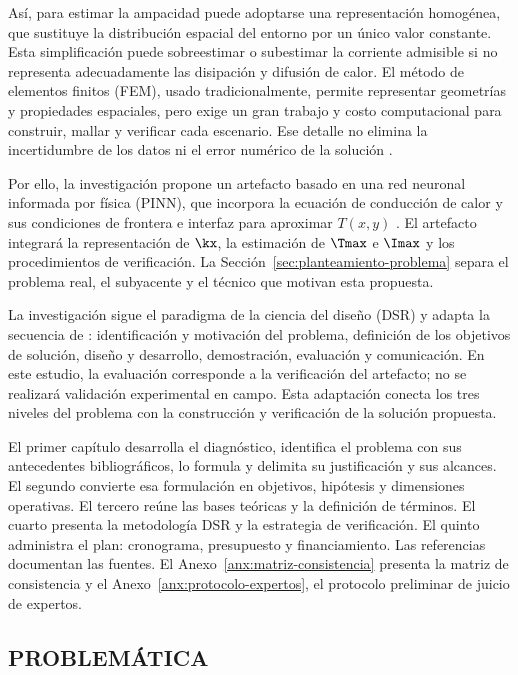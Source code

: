 Así, para estimar la ampacidad puede adoptarse una representación homogénea, que sustituye la distribución espacial del entorno por un único valor constante. Esta simplificación puede sobreestimar o subestimar la corriente admisible si no representa adecuadamente las  disipación y difusión de calor. El método de elementos finitos (FEM), usado tradicionalmente, permite representar geometrías y propiedades espaciales, pero exige un gran trabajo y costo computacional para construir, mallar y verificar cada escenario. Ese detalle no elimina la incertidumbre de los datos ni el error numérico de la solución \parencites[41--42,93--99]{cigre2025}[1--3,12]{aldulaimi2024}.

Por ello, la investigación propone un artefacto basado en una red neuronal informada por física (PINN), que incorpora la ecuación de conducción de calor y sus condiciones de frontera e interfaz para aproximar \(T(x,y)\) \parencite{raissi2019}. El artefacto integrará la representación de \(\kx\), la estimación de \(\Tmax\) e \(\Imax\) y los procedimientos de verificación. La Sección~\ref{sec:planteamiento-problema} separa el problema real, el subyacente y el técnico que motivan esta propuesta.

La investigación sigue el paradigma de la ciencia del diseño (DSR) y adapta la secuencia de \textcite[54--56]{peffers2007}: identificación y motivación del problema, definición de los objetivos de solución, diseño y desarrollo, demostración, evaluación y comunicación. En este estudio, la evaluación corresponde a la verificación del artefacto; no se realizará validación experimental en campo. Esta adaptación conecta los tres niveles del problema con la construcción y verificación de la solución propuesta.

El primer capítulo desarrolla el diagnóstico, identifica el problema con sus antecedentes bibliográficos, lo formula y delimita su justificación y sus alcances. El segundo convierte esa formulación en objetivos, hipótesis y dimensiones operativas. El tercero reúne las bases teóricas y la definición de términos. El cuarto presenta la metodología DSR y la estrategia de verificación. El quinto administra el plan: cronograma, presupuesto y financiamiento. Las referencias documentan las fuentes. El Anexo~\ref{anx:matriz-consistencia} presenta la matriz de consistencia y el Anexo~\ref{anx:protocolo-expertos}, el protocolo preliminar de juicio de expertos.

\subsection{PROBLEMÁTICA}

